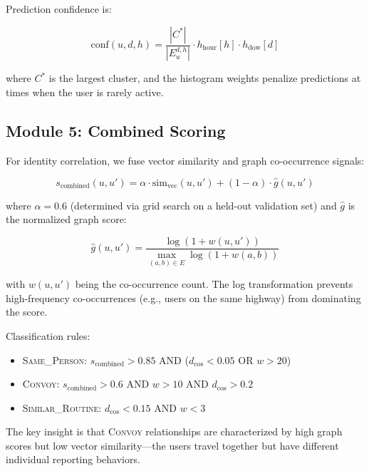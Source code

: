 \documentclass[11pt,a4paper]{article}
\begin{document}
Prediction confidence is:

\begin{equation}
\label{eq:pred_confidence}
\text{conf}(u, d, h) = \frac{|C^*|}{|E_u^{d,h}|} \cdot h_{\text{hour}}[h] \cdot h_{\text{dow}}[d]
\end{equation}

where $C^*$ is the largest cluster, and the histogram weights penalize predictions at times when the user is rarely active.

\subsection{Module 5: Combined Scoring}
\label{sec:combined}

For identity correlation, we fuse vector similarity and graph co-occurrence signals:

\begin{equation}
\label{eq:combined}
s_{\text{combined}}(u, u') = \alpha \cdot \text{sim}_{\text{vec}}(u, u') + (1 - \alpha) \cdot \hat{g}(u, u')
\end{equation}

where $\alpha = 0.6$ (determined via grid search on a held-out validation set) and $\hat{g}$ is the normalized graph score:

\begin{equation}
\label{eq:graph_norm}
\hat{g}(u, u') = \frac{\log(1 + w(u, u'))}{\max_{(a,b) \in E} \log(1 + w(a, b))}
\end{equation}

with $w(u, u')$ being the co-occurrence count. The log transformation prevents high-frequency co-occurrences (e.g., users on the same highway) from dominating the score.

Classification rules:

\begin{itemize}
    \item \textsc{Same\_Person}: $s_{\text{combined}} > 0.85$ AND ($d_{\cos} < 0.05$ OR $w > 20$)
    \item \textsc{Convoy}: $s_{\text{combined}} > 0.6$ AND $w > 10$ AND $d_{\cos} > 0.2$
    \item \textsc{Similar\_Routine}: $d_{\cos} < 0.15$ AND $w < 3$
\end{itemize}

The key insight is that \textsc{Convoy} relationships are characterized by high graph scores but low vector similarity---the users travel together but have different individual reporting behaviors.
\end{document}
